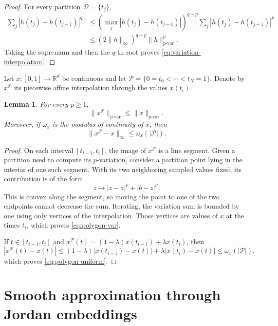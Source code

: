 \documentclass[11pt,reqno]{amsart}
\newtheorem{lemma}[theorem]{Lemma}
\theoremstyle{definition}
\theoremstyle{remark}
\newcommand{\R}{\mathbb{R}}
\begin{document}
\begin{proof}
For every partition \(\mathcal D=\{t_j\}\),
\[
\begin{aligned}
 \sum_j |h(t_j)-h(t_{j-1})|^q
 &\leq
 \left(\max_j|h(t_j)-h(t_{j-1})|\right)^{q-p}
 \sum_j|h(t_j)-h(t_{j-1})|^p\\
 &\leq
 (2\lVert h\rVert_\infty)^{q-p}
 \lVert h\rVert_{p\text{-var}}^p.
\end{aligned}
\]
Taking the supremum and then the \(q\)-th root proves
\eqref{eq:variation-interpolation}.
\end{proof}

Let \(x\colon[0,1]\to\R^d\) be continuous and let
\(\mathcal P=\{0=t_0<\cdots<t_N=1\}\).  Denote by \(x^{\mathcal P}\) its
piecewise affine interpolation through the values \(x(t_i)\).

\begin{lemma}\label{lem:polygon-var}
For every \(p\geq1\),
\begin{equation}\label{eq:polygon-var}
 \lVert x^{\mathcal P}\rVert_{p\text{-var}}
 \leq \lVert x\rVert_{p\text{-var}}.
\end{equation}
Moreover, if \(\omega_x\) is the modulus of continuity of \(x\), then
\begin{equation}\label{eq:polygon-uniform}
 \lVert x^{\mathcal P}-x\rVert_\infty
 \leq \omega_x(|\mathcal P|).
\end{equation}
\end{lemma}

\begin{proof}
On each interval \([t_{i-1},t_i]\), the image of
\(x^{\mathcal P}\) is a line segment.  Given a partition used to compute its
\(p\)-variation, consider a partition point lying in the interior of one such
segment.  With its two neighboring sampled values fixed, its contribution is
of the form
\[
 z\longmapsto |z-a|^p+|b-z|^p.
\]
This is convex along the segment, so moving the point to one of the two
endpoints cannot decrease the sum.  Iterating, the variation sum is bounded
by one using only vertices of the interpolation.  Those vertices are values
of \(x\) at the times \(t_i\), which proves \eqref{eq:polygon-var}.

If \(t\in[t_{i-1},t_i]\) and
\(x^{\mathcal P}(t)=(1-\lambda)x(t_{i-1})+\lambda x(t_i)\), then
\[
 |x^{\mathcal P}(t)-x(t)|
 \leq
 (1-\lambda)|x(t_{i-1})-x(t)|
 +\lambda|x(t_i)-x(t)|
 \leq\omega_x(|\mathcal P|),
\]
which proves \eqref{eq:polygon-uniform}.
\end{proof}

\section{Smooth approximation through Jordan embeddings}
\end{document}
